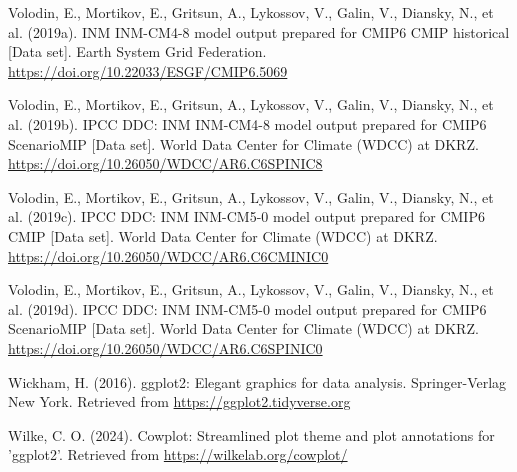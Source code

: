 \documentclass[
]{agujournal2019}
\newlength{\cslhangindent}
\newenvironment{CSLReferences}[2] %
 {\begin{list}{}{%
  \setlength{\itemindent}{0pt}
  \setlength{\leftmargin}{0pt}
  \setlength{\parsep}{0pt}
  \ifodd #1
   \setlength{\leftmargin}{\cslhangindent}
   \setlength{\itemindent}{-1\cslhangindent}
  \fi
  \setlength{\itemsep}{#2\baselineskip}}}
 {\end{list}}
\begin{document}
\begin{CSLReferences}{1}{0}
Volodin, E., Mortikov, E., Gritsun, A., Lykossov, V., Galin, V.,
Diansky, N., et al. (2019a). {INM INM-CM4-8} model output prepared for
{CMIP6 CMIP} historical {[}Data set{]}. Earth System Grid Federation.
\url{https://doi.org/10.22033/ESGF/CMIP6.5069}

Volodin, E., Mortikov, E., Gritsun, A., Lykossov, V., Galin, V.,
Diansky, N., et al. (2019b). {IPCC DDC}: {INM INM-CM4-8} model output
prepared for {CMIP6 ScenarioMIP} {[}Data set{]}. World Data Center for
Climate (WDCC) at DKRZ.
\url{https://doi.org/10.26050/WDCC/AR6.C6SPINIC8}

Volodin, E., Mortikov, E., Gritsun, A., Lykossov, V., Galin, V.,
Diansky, N., et al. (2019c). {IPCC DDC}: {INM INM-CM5-0} model output
prepared for {CMIP6 CMIP} {[}Data set{]}. World Data Center for Climate
(WDCC) at DKRZ. \url{https://doi.org/10.26050/WDCC/AR6.C6CMINIC0}

Volodin, E., Mortikov, E., Gritsun, A., Lykossov, V., Galin, V.,
Diansky, N., et al. (2019d). {IPCC DDC}: {INM INM-CM5-0} model output
prepared for {CMIP6 ScenarioMIP} {[}Data set{]}. World Data Center for
Climate (WDCC) at DKRZ.
\url{https://doi.org/10.26050/WDCC/AR6.C6SPINIC0}

Wickham, H. (2016). ggplot2: Elegant graphics for data analysis.
Springer-Verlag New York. Retrieved from
\url{https://ggplot2.tidyverse.org}

Wilke, C. O. (2024). Cowplot: Streamlined plot theme and plot
annotations for 'ggplot2'. Retrieved from
\url{https://wilkelab.org/cowplot/}

\end{CSLReferences}
\end{document}
